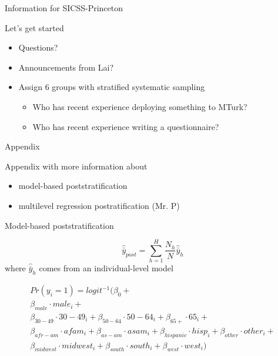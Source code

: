 \documentclass[aspectratio=169]{beamer}
\begin{document}
\begin{frame}{Information for SICSS-Princeton}

Let's get started 
\begin{itemize}
\item Questions?
\pause
\item Announcements from Lai?
\pause
\item Assign 6 groups with stratified systematic sampling
\begin{itemize}
\item Who has recent experience deploying something to MTurk? \pause
\item Who has recent experience writing a questionnaire? 
\end{itemize}
\end{itemize}

\end{frame}
\begin{frame}{Appendix}

Appendix with more information about 
\begin{itemize}
\item model-based poststratification
\item multilevel regression postratification (Mr. P)
\end{itemize}

\end{frame}
\begin{frame}{Model-based poststratification}

\begin{equation*}
\hat{\bar{y}}_{post} = \sum_{h=1}^H \frac{N_h}{N} \hat{\bar{y}}_h
\end{equation*}
where
$\hat{\bar{y}}_h$ comes from an individual-level model

\begin{align*}
Pr(y_i = 1) = logit^{-1} (\beta_0 + \\
 \beta_{male} \cdot male_i+ \\
 \beta_{30-49} \cdot 30-49_i + \beta_{50 - 64} \cdot 50-64_i+ \beta_{65+} \cdot 65_i +\\
 \beta_{afr-am} \cdot afam_i + \beta_{as-am} \cdot asam_i+ \beta_{hispanic} \cdot hisp_i + \beta_{other} \cdot other_i + \\
 \beta_{midwest} \cdot midwest_i + \beta_{south} \cdot south_i + \beta_{west} \cdot west_i)
\end{align*}

\end{frame}
\end{document}
